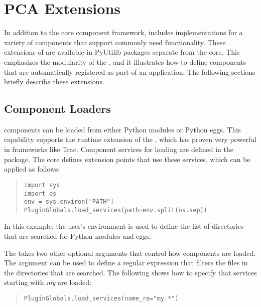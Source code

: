 
\section{PCA Extensions}

\label{chap:extensions}

In addition to the core component framework, \pcasp includes implementations
for a variety of components that support commonly used functionality. 
These extensions of \pcasp are available in PyUtilib packages separate 
from the \pcasp core.  This emphasizes the modularity of the \pca, 
and it illustrates how to define \pcasp components that are 
automatically registered as part of an application.
The following sections briefly describe these \pcasp extensions.


\subsection{Component Loaders}

\label{sec:loaders}

\pcasp components can be loaded from either Python modules or Python eggs. This
capability supports the runtime extension of the \pca,
which has proven very powerful in frameworks like Trac. 
Component services for loading are defined in the  package.
The core \pcasp
defines extension points that use these services, which can be
applied as follows:
\begin{quotation}
\begin{lstlisting}
import sys
import os
env = sys.environ["PATH"]
PluginGlobals.load_services(path=env.split(os.sep))
\end{lstlisting}
\end{quotation}
In this example, the user's  environment is used to define the list
of directories that are searched for Python modules and eggs.  

The  takes two other optional arguments that control
how components are loaded.  The  argument can be used to
define a regular expression that filters the files in the directories
that are searched.  The following shows how to specify that services starting with \textit{my}
are loaded:
\begin{quotation}
\begin{lstlisting}
PluginGlobals.load_services(name_re="my.*")
\end{lstlisting}
\end{quotation}

